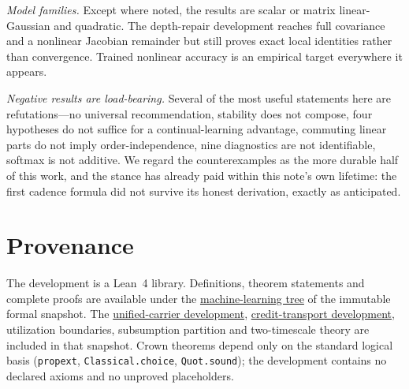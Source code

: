 \documentclass[11pt]{article}
\newcommand{\code}[1]{\texttt{#1}}
\newcommand{\formalcommit}{f3a31db36bb2f944312ee31c1d86c2758109e83a}
\begin{document}
\emph{Model families.} Except where noted, the results are scalar or matrix
linear-Gaussian and quadratic. The depth-repair development reaches full covariance and a
nonlinear Jacobian remainder but still proves exact local identities rather than
convergence. Trained nonlinear accuracy is an empirical target everywhere it appears.

\emph{Negative results are load-bearing.} Several of the most useful statements here are
refutations---no universal recommendation, stability does not compose, four hypotheses do
not suffice for a continual-learning advantage, commuting linear parts do not imply
order-independence, nine diagnostics are not identifiable, softmax is not additive. We
regard the counterexamples as the more durable half of this work, and the stance has
already paid within this note's own lifetime: the first cadence formula did not survive
its honest derivation, exactly as anticipated.

\section*{Provenance}

The development is a Lean~4 library. Definitions, theorem statements and complete proofs
are available under the
\href{https://github.com/zariuq/MeTTapedia/tree/\formalcommit/lean/mettapedia/Mettapedia/MachineLearning/NeuralNetworks}{machine-learning tree}
of the immutable formal snapshot. The
\href{https://github.com/zariuq/MeTTapedia/tree/\formalcommit/lean/mettapedia/Mettapedia/MachineLearning/NeuralNetworks/UnifiedCarrier}{unified-carrier development},
\href{https://github.com/zariuq/MeTTapedia/tree/\formalcommit/lean/mettapedia/Mettapedia/MachineLearning/NeuralNetworks/CreditTransport}{credit-transport development},
utilization boundaries, subsumption partition and two-timescale theory are included in
that snapshot. Crown theorems depend only on the standard logical basis
(\code{propext}, \code{Classical.choice}, \code{Quot.sound}); the development contains no
declared axioms and no unproved placeholders.
\end{document}
